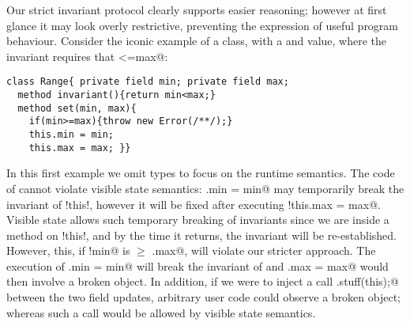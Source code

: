 Our strict invariant protocol clearly supports easier reasoning; however 
at first glance it may look overly restrictive, preventing the expression of useful program behaviour.
Consider the iconic example of a \Q@Range@ class, with a \Q@min@ and \Q@max@
value, where the invariant requires that \Q@min<=max@:
\begin{lstlisting}
class Range{ private field min; private field max;
  method invariant(){return min<max;}
  method set(min, max){
    if(min>=max){throw new Error(/**/);}
    this.min = min;
    this.max = max; }}
\end{lstlisting}
In this first example we omit types to focus on the runtime semantics.
The code of \Q@set@ cannot violate visible state semantics:
\Q@this.min = min@ may temporarily break the invariant of \Q!this!, however it will be fixed after executing \Q!this.max = max@. Visible state allows such temporary breaking of invariants since we are inside a method on \Q!this!, and by the time it returns, the invariant will be re-established.
However, this, if \Q!min@ is $\geq$ \Q@this.max@, \Q@set@ will violate our stricter approach. The execution of
\Q@this.min = min@ will break the invariant of \Q@this@ and \Q@this.max = max@ would then involve a broken object. In addition, if we were to inject a call
\Q@Do.stuff(this);@ between the two field updates, arbitrary user code could observe a broken object; whereas such a call would be allowed by visible state semantics.


